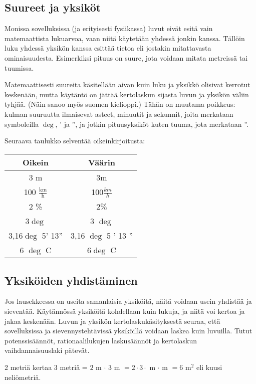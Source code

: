 \subsection*{Suureet ja yksiköt}

Monissa sovelluksissa (ja erityisesti fysiikassa) luvut eivät esitä vain matemaattista lukuarvoa, vaan niitä käytetään yhdessä jonkin  kanssa.
Tällöin luku yhdessä yksikön kanssa esittää tietoa  eli jostakin mitattavasta ominaisuudesta.
Esimerkiksi pituus on suure, jota voidaan mitata metreissä tai tuumissa.


Matemaattisesti suureita käsitellään aivan kuin luku ja yksikkö olisivat kerrotut keskenään, mutta käytäntö on jättää kertolaskun sijasta luvun ja yksikön väliin tyhjää. (Näin sanoo myös suomen kielioppi.) Tähän on muutama poikkeus: kulman suuruutta ilmaisevat asteet, minuutit ja sekunnit, joita merkataan symboleilla $\deg$, ' ja '', ja jotkin pituusyksiköt kuten tuuma, jota merkataan ''.

Seuraava taulukko selventää oikeinkirjoitusta:

\begin{tabular}{c|c}
Oikein & Väärin \\
\hline
3 m & 3m 	\\
100 $\frac{\text{km}}{\text{h}}$ & 100$\frac{km}{h}$	\\
2 \% & 2\% 	\\
3$\deg$ & 3 $\deg$\\
3,16$\deg$ 5' 13'' & 3,16 $\deg$ 5 ' 13 '' 	\\
6 $\deg$ C & 6$\deg$ C 	\\
\end{tabular}

\subsection*{Yksiköiden yhdistäminen}

Jos lausekkeessa on useita samanlaisia yksiköitä, näitä voidaan usein yhdistää ja sieventää. Käytännössä yksiköitä kohdellaan kuin lukuja, ja niitä voi kertoa ja jakaa keskenään.
Luvun ja yksikön kertolaskukäsityksestä seuraa, että sovelluksissa ja sievennystehtävissä yksiköillä voidaan laskea kuin luvuilla.
Tutut potenssisäännöt, rationaalilukujen laskusäännöt ja kertolaskun vaihdannaisuuslaki pätevät.

\begin{esimerkki}
2 metriä kertaa 3 metriä = $2$ m $\cdot$ $3$ m $=2 \cdot 3 \cdot$ m $\cdot$ m $=6 $ m$^2$ eli kuusi neliömetriä.
\end{esimerkki}


